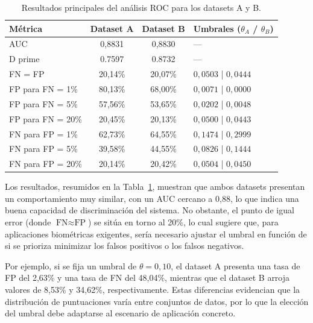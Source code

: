 \documentclass[11pt,spanish,listoffigures,listoftables]{tfgetsinf}
\begin{document}
\begin{table}[H]
    \centering
    \begin{tabular}{lccl}
        \toprule
        \textbf{Métrica} & \textbf{Dataset A} & \textbf{Dataset B} & \textbf{Umbrales ($\theta_A$ / $\theta_B$)} \\
        \midrule
        AUC & 0,8831 & 0,8830 & — \\
        D prime & 0.7597 & 0.8732 & — \\
        \midrule
        FN = FP & 20,14\% & 20,07\% & $0{,}0503$ | $0{,}0444$ \\
        \rule{0pt}{3ex}
        FP para FN = 1\% & 80,13\% & 68,00\% & $0{,}0071$ | $0{,}0000$ \\
        FP para FN = 5\% & 57,56\% & 53,65\% & $0{,}0202$ | $0{,}0048$ \\
        FP para FN = 20\% & 20,45\% & 20,13\% & $0{,}0500$ | $0{,}0443$ \\
        \rule{0pt}{3ex}
        FN para FP = 1\% & 62,73\% & 64,55\% & $0{,}1474$ | $0{,}2999$ \\
        FN para FP = 5\% & 39,58\% & 44,55\% & $0{,}0826$ | $0{,}1444$ \\
        FN para FP = 20\% & 20,14\% & 20,42\% & $0{,}0504$ | $0{,}0450$ \\

        \bottomrule
    \end{tabular}
    \caption{Resultados principales del análisis ROC para los datasets A y B.}
    \label{tab:roc_results}
\end{table}

Los resultados, resumidos en la Tabla~\ref{tab:roc_results}, muestran que ambos datasets presentan un comportamiento muy similar, con un AUC cercano a 0,88, lo que indica una buena capacidad de discriminación del sistema. No obstante, el punto de igual error (donde $\text{FN} \approx \text{FP}$) se sitúa en torno al 20\%, lo cual sugiere que, para aplicaciones biométricas exigentes, sería necesario ajustar el umbral en función de si se prioriza minimizar los falsos positivos o los falsos negativos.

Por ejemplo, si se fija un umbral de $\theta = 0{,}10$, el dataset A presenta una tasa de FP del 2,63\% y una tasa de FN del 48,04\%, mientras que el dataset B arroja valores de 8,53\% y 34,62\%, respectivamente. Estas diferencias evidencian que la distribución de puntuaciones varía entre conjuntos de datos, por lo que la elección del umbral debe adaptarse al escenario de aplicación concreto.
\end{document}
